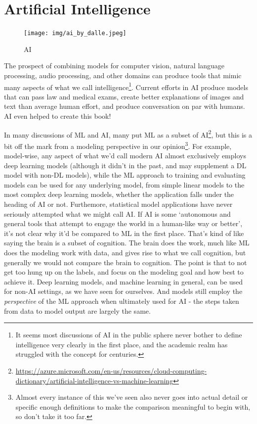 \documentclass[
  letterpaper,
]{krantz}
\DeclareRobustCommand{\href}[2]{#2\footnote{\url{#1}}}
\begin{document}
\section{Artificial Intelligence}\label{sec-ml-more-ai}

\begin{figure}[H]

{\centering \texttt{[image: img/ai\_by\_dalle.jpeg]}

}

\caption{AI}

\end{figure}%

The prospect of combining models for computer vision, natural language
processing, audio processing, and other domains can produce tools that
mimic many aspects of what we call intelligence\footnote{It seems most
  discussions of AI in the public sphere never bother to define
  intelligence very clearly in the first place, and the academic realm
  has struggled with the concept for centuries.}. Current efforts in AI
produce models that can pass law and medical exams, create better
explanations of images and text than average human effort, and produce
conversation on par with humans. AI even helped to create this book!

In many discussions of ML and AI,
\href{https://azure.microsoft.com/en-us/resources/cloud-computing-dictionary/artificial-intelligence-vs-machine-learning}{many
put ML as a subset of AI}, but this is a bit off the mark from a
modeling perspective in our opinion\footnote{Almost every instance of
  this we've seen also never goes into actual detail or specific enough
  definitions to make the comparison meaningful to begin with, so don't
  take it too far.}. For example, model-wise, any aspect of what we'd
call modern AI almost exclusively employs deep learning models (although
it didn't in the past, and may supplement a DL model with non-DL
models), while the ML approach to training and evaluating models can be
used for any underlying model, from simple linear models to the most
complex deep learning models, whether the application falls under the
heading of AI or not. Furthemore, statistical model applications have
never seriously attempted what we might call AI. If AI is some
`autonomous and general tools that attempt to engage the world in a
human-like way or better', it's not clear why it'd be compared to ML in
the first place. That's kind of like saying the brain is a subset of
cognition. The brain does the work, much like ML does the modeling work
with data, and gives rise to what we call cognition, but generally we
would not compare the brain to cognition. The point is that to not get
too hung up on the labels, and focus on the modeling goal and how best
to achieve it. Deep learning models, and machine learning in general,
can be used for non-AI settings, as we have seen for ourselves. And
models still employ the \emph{perspective} of the ML approach when
ultimately used for AI - the steps taken from data to model output are
largely the same.
\end{document}
